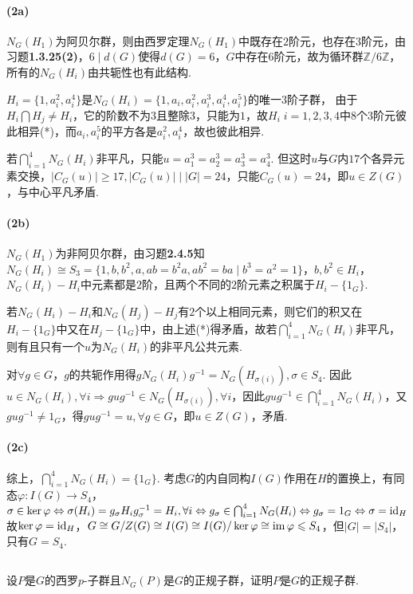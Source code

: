 {	\paragraph{(2a)}
	
	$N_G(H_1)$为阿贝尔群，则由西罗定理$N_G(H_1)$中既存在$2$阶元，也存在$3$阶元，由{\heiti 习题}\textbf{1.3.25(2)}，$6\mid d(G)$使得$d(G)=6$，$G$中存在$6$阶元，故为循环群$\mathbb{Z}/6\mathbb{Z}$，所有的$N_G(H_i)$由共轭性也有此结构.
	
	$H_i=\{1,a_i^2,a_i^4\}$是$N_G(H_i)=\{1,a_i,a_i^2,a_i^3,a_i^4,a_i^5\}$的唯一$3$阶子群，
	由于$H_i\bigcap H_j\neq H_i$，它的阶数不为$3$且整除$3$，只能为$1$，故$H_i\;i=1,2,3,4$中$8$个$3$阶元彼此相异(*)，而$a_i, a_i^5$的平方各是$a_i^2,a_i^4$，故也彼此相异. 
	
	若$\bigcap_{i=1}^4N_G(H_i)$非平凡，只能$u=a_1^3=a_2^3=a_3^3=a_4^3$. 但这时$u$与$G$内$17$个各异元素交换，$|C_G(u)|\geq 17, |C_G(u)|\mid |G|=24$，只能$C_G(u)=24$，即$u\in Z(G)$，与中心平凡矛盾.
	 
	 \paragraph{(2b)}
	 
	 $N_G(H_1)$为非阿贝尔群，由{\heiti 习题}\textbf{2.4.5}知$N_G(H_i)\cong S_3=\{1,b,b^2,a,ab=b^2a,ab^2=ba\mid b^3=a^2=1\}$，$b,b^2\in H_i$，$N_G(H_i)-H_i$中元素都是$2$阶，且两个不同的$2$阶元素之积属于$H_i-\{1_G\}$.
	 
	 若$N_G(H_i)-H_i$和$N_G(H_j)-H_j$有$2$个以上相同元素，则它们的积又在$H_i-\{1_G\}$中又在$H_j-\{1_G\}$中，由上述(*)得矛盾，故若$\bigcap_{i=1}^4N_G(H_i)$非平凡，则有且只有一个$u$为$N_G(H_i)$的非平凡公共元素.
	 
	 对$\forall g\in G$，$g$的共轭作用得$gN_G(H_i)g^{-1}=N_G(H_{\sigma(i)}), \sigma\in S_4$. 因此$u\in N_G(H_i),\forall i\Rightarrow gug^{-1}\in N_G(H_{\sigma(i)}),\forall i$，因此$gug^{-1}\in\bigcap_{i=1}^4N_G(H_i)$，又$gug^{-1}\neq 1_G$，得$gug^{-1}=u, \forall g\in G$，即$u\in Z(G)$，矛盾.
	 
	 \paragraph{(2c)}
	 综上，$\bigcap_{i=1}^4N_G(H_i)=\{1_G\}$. 考虑$G$的内自同构$I(G)$作用在$H$的置换上，有同态$\varphi: I(G)\rightarrow S_4$，$\sigma \in \ker\varphi \Leftrightarrow \sigma(H_i)=g_{\sigma}H_ig_{\sigma}^{-1}=H_i,  \forall i\Leftrightarrow g_{\sigma}\in \bigcap_{i=1}^4N_G(H_i)\Leftrightarrow g_{\sigma}=1_G\Leftrightarrow \sigma=\operatorname{id}_H$
	 故$\ker\varphi=\operatorname{id}_H$，$G\cong G/Z(G)\cong I(G)\cong I(G)/\ker\varphi\cong \operatorname{im}\varphi\leqslant S_4$，但$|G|=|S_4|$，只有$G=S_4$.
}

\subsection{}
设$P$是$G$的西罗$p$-子群且$N_G(P)$是$G$的正规子群，证明$P$是$G$的正规子群.

